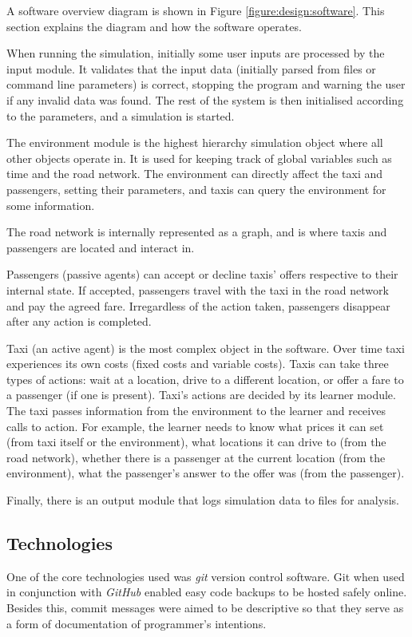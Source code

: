 A software overview diagram is shown in Figure \ref{figure:design:software}.
This section explains the diagram and how the software operates.

When running the simulation, initially some user inputs are processed by the
input module. It validates that the input data (initially parsed from files or
command line parameters) is correct, stopping the program and warning the user
if any invalid data was found. The rest of the system is then initialised
according to the parameters, and a simulation is started.

The environment module is the highest hierarchy simulation object where all
other objects operate in. It is used for keeping track of global variables such
as time and the road network. The environment can directly affect the taxi and
passengers, setting their parameters, and taxis can query the environment for
some information.

The road network is internally represented as a graph, and is where taxis and
passengers are located and interact in.

Passengers (passive agents) can accept or decline taxis' offers respective to
their internal state. If accepted, passengers travel with the taxi in the road
network and pay the agreed fare. Irregardless of the action taken, passengers
disappear after any action is completed.

Taxi (an active agent) is the most complex object in the software. Over time
taxi experiences its own costs (fixed costs and variable costs). Taxis can take
three types of actions: wait at a location, drive to a different location, or
offer a fare to a passenger (if one is present). Taxi's actions are decided by
its learner module. The taxi passes information from the environment to the
learner and receives calls to action. For example, the learner needs to know
what prices it can set (from taxi itself or the environment), what locations it
can drive to (from the road network), whether there is a passenger at the
current location (from the environment), what the passenger's answer to the
offer was (from the passenger).

Finally, there is an output module that logs simulation data to files for
analysis.


\subsection{Technologies}

One of the core technologies used was \textit{git} \parencite{Git} version
control software. Git when used in conjunction with \textit{GitHub}
\parencite{Github} enabled easy code backups to be hosted safely online.
Besides this, commit messages were aimed to be descriptive so that they serve
as a form of documentation of programmer's intentions.

